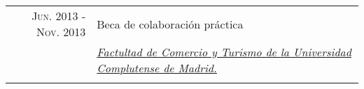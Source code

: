 \documentclass[a4paper,10pt]{article}
\begin{document}
\begin{tabular}{r|p{11cm}}
 	\textsc{Jun. 2013 - Nov. 2013} & 	Beca de colaboración práctica \\&
	\emph{\href{https://comercioyturismo.ucm.es/}{Factultad de Comercio y Turismo de la Universidad Complutense de Madrid.}}\\&

\end{tabular}

\end{document}
